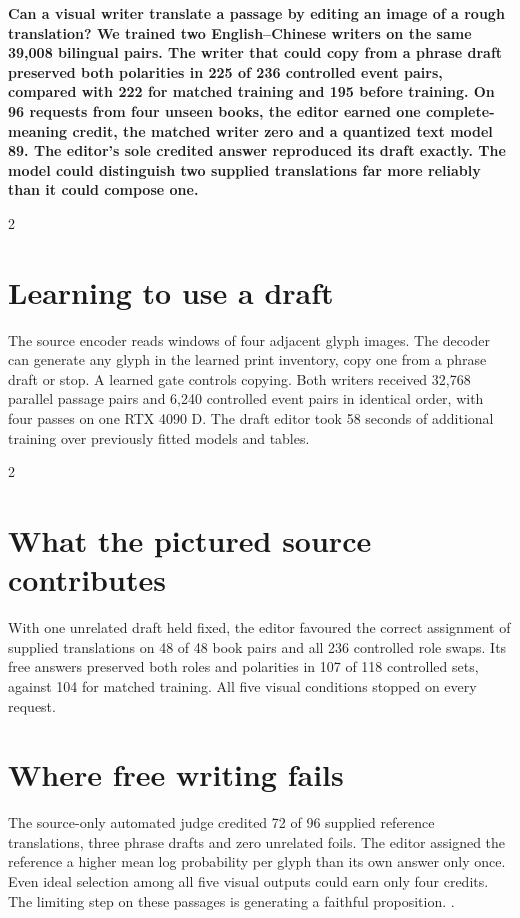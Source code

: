 \noindent\textbf{Can a visual writer translate a passage by editing an image of a rough translation? We trained two English--Chinese writers on the same 39,008 bilingual pairs. The writer that could copy from a phrase draft preserved both polarities in 225 of 236 controlled event pairs, compared with 222 for matched training and 195 before training. On 96 requests from four unseen books, the editor earned one complete-meaning credit, the matched writer zero and a quantized text model 89. The editor's sole credited answer reproduced its draft exactly. The model could distinguish two supplied translations far more reliably than it could compose one.}\par
\begin{multicols}{2}
\section*{Learning to use a draft}
The source encoder reads windows of four adjacent glyph images. The decoder can generate any glyph in the learned print inventory, copy one from a phrase draft or stop. A learned gate controls copying.\cite{pointer} Both writers received 32,768 parallel passage pairs and 6,240 controlled event pairs in identical order, with four passes on one RTX 4090 D. The draft editor took 58 seconds of additional training over previously fitted models and tables.
\end{multicols}
\begin{multicols}{2}
\section*{What the pictured source contributes}
With one unrelated draft held fixed, the editor favoured the correct assignment of supplied translations on 48 of 48 book pairs and all 236 controlled role swaps. Its free answers preserved both roles and polarities in 107 of 118 controlled sets, against 104 for matched training. All five visual conditions stopped on every request.\par
\section*{Where free writing fails}
The source-only automated judge credited 72 of 96 supplied reference translations, three phrase drafts and zero unrelated foils. The editor assigned the reference a higher mean log probability per glyph than its own answer only once. Even ideal selection among all five visual outputs could earn only four credits. The limiting step on these passages is generating a faithful proposition. .
\end{multicols}
